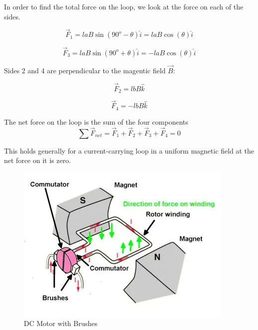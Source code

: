 \documentclass[14pt]{memoir}
\begin{document}
In order to find the total force on the loop, we look at the force on each of the sides.

\begin{equation}
\vec{F}_1 = l a B \sin(90^o - \theta) \hat{i} = l a B \cos(\theta) \hat{i}
\end{equation}

\begin{equation}
\vec{F}_3 = l a B \sin(90^o + \theta) \hat{i} = -l a B \cos(\theta) \hat{i}
\end{equation}

Sides 2 and 4 are perpendicular to the magentic field $\vec{B}$:

\begin{equation}
\vec{F}_2 = l b B \hat{k}
\end{equation}

\begin{equation}
\vec{F}_4 = -l b B \hat{k}
\end{equation}


The net force on the loop is the sum of the four components
\begin{equation}
\sum \vec{F}_{net} = \vec{F}_1 + \vec{F}_2 + \vec{F}_3 + \vec{F}_4 = 0
\end{equation}

This holds generally for a current-carrying loop in a uniform magnetic field at the net force on it is zero.

\begin{figure}[H]
\begin{center}
\includegraphics[scale=0.7]{fig/dcmotor.png}
\caption{DC Motor with Brushes}
\label{fig:dcmotor}
\end{center}
\end{figure}
\end{document}
